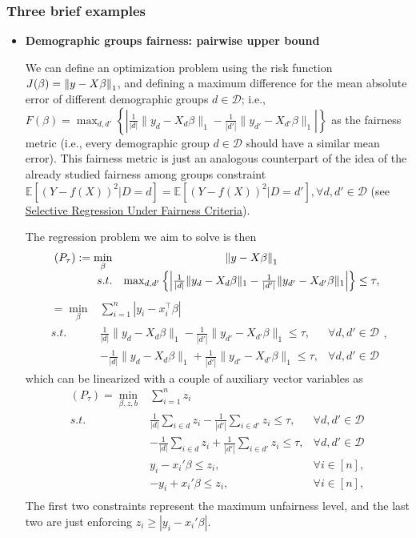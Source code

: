 \documentclass{article}
\newcommand{\D}{\mathcal{D}}
\newcommand{\Expected}[1]{\mathbb{E}[#1]}
\begin{document}
\subsubsection{Three brief examples}
\begin{itemize}
    \item \textbf{Demographic groups fairness: pairwise upper bound}

We can define an optimization problem using the risk function $J(\beta)=\norm[1]{y-X\beta}$, and defining a maximum difference for the mean absolute error of different demographic groups $d\in \D$; i.e., $F(\beta)= \max_{d,d'}\left\{\left|\frac{1}{|d|}\|y_d-X_d\beta\|_1 - \frac{1}{|d'|}\|y_{d'}-X_{d'}\beta\|_1\right|\right\}$ as the fairness metric (i.e., every demographic group $d\in \D$ should have a similar mean error). This fairness metric is just an analogous counterpart of the idea of the already studied fairness among groups constraint $\Expected{(Y-f(X))^2|D=d}=\Expected{(Y-f(X))^2|D=d'}, \forall d,d' \in \D$ (see \href{https://arxiv.org/abs/2110.15403}{Selective Regression Under Fairness Criteria}).


The regression problem we aim to solve is then
\[
\begin{array}{rc}
\displaystyle
   (P_\tau):= \min_{\beta} &  \norm[1]{y-X\beta}\\
     s.t. &  \max_{d,d'}\left\{\left|\frac{1}{|d|}\|y_d-X_d\beta\|_1 - \frac{1}{|d'|}\|y_{d'}-X_{d'}\beta\|_1\right|\right\}\leq \tau,
\end{array}
\]
\[
\begin{array}{rcc}
\displaystyle
   =\min_{\beta} &  \sum_{i=1}^n |y_i-x_i^{\top}\beta| \quad \quad \quad\\
     s.t. & \frac{1}{|d|}\|y_d-X_d\beta\|_1 - \frac{1}{|d'|}\|y_{d'}-X_{d'}\beta\|_1\leq \tau, & \forall d,d' \in \D\\
      & -\frac{1}{|d|}\|y_d-X_d\beta\|_1 + \frac{1}{|d'|}\|y_{d'}-X_{d'}\beta\|_1\leq \tau, & \forall d,d' \in \D
\end{array},
\]
which can be linearized with a couple of auxiliary vector variables as
\[
\begin{array}{rcc}
\displaystyle
   (P_\tau)=\min_{\beta,z,b} &  \sum_{i=1}^nz_i \quad \quad \quad\\
     s.t. & \frac{1}{|d|}\sum_{i\in d}z_i - \frac{1}{|d'|}\sum_{i\in d'}z_i\leq \tau, & \forall d,d' \in \D\\
      & -\frac{1}{|d|}\sum_{i\in d}z_i + \frac{1}{|d'|}\sum_{i\in d'}z_i\leq \tau, & \forall d,d' \in \D\\
      & y_i-x_i'\beta \leq z_i, & \forall i \in [n],\\ %
      & -y_i+x_i'\beta \leq z_i, & \forall i \in [n],\\%
\end{array}
\]
The first two constraints represent the maximum unfairness level, and the last two are just enforcing  $z_i \geq |y_i - x_i'\beta|$.


\end{itemize}
\end{document}
